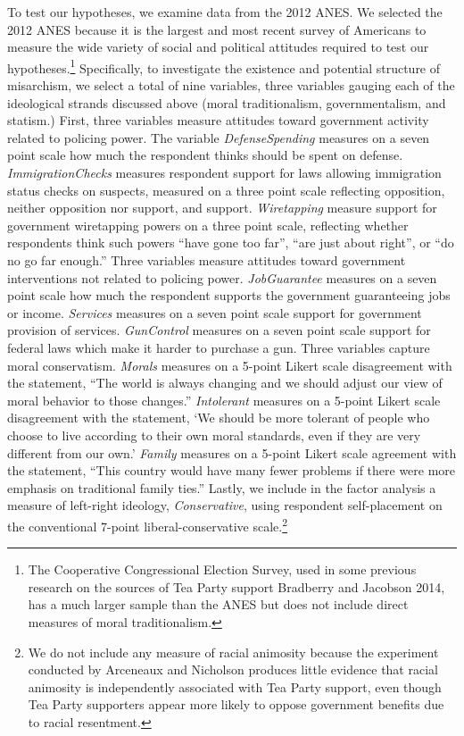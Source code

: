 \documentclass[12pt,]{article}
\begin{document}
To test our hypotheses, we examine data from the 2012 ANES. We selected
the 2012 ANES because it is the largest and most recent survey of
Americans to measure the wide variety of social and political attitudes
required to test our hypotheses.\footnote{The Cooperative Congressional
  Election Survey, used in some previous research on the sources of Tea
  Party support Bradberry and Jacobson 2014, has a much larger sample
  than the ANES but does not include direct measures of moral
  traditionalism.} Specifically, to investigate the existence and
potential structure of misarchism, we select a total of nine variables,
three variables gauging each of the ideological strands discussed above
(moral traditionalism, governmentalism, and statism.) First, three
variables measure attitudes toward government activity related to
policing power. The variable \emph{DefenseSpending} measures on a seven
point scale how much the respondent thinks should be spent on defense.
\emph{ImmigrationChecks} measures respondent support for laws allowing
immigration status checks on suspects, measured on a three point scale
reflecting opposition, neither opposition nor support, and support.
\emph{Wiretapping} measure support for government wiretapping powers on
a three point scale, reflecting whether respondents think such powers
``have gone too far'', ``are just about right'', or ``do no go far
enough.'' Three variables measure attitudes toward government
interventions not related to policing power. \emph{JobGuarantee}
measures on a seven point scale how much the respondent supports the
government guaranteeing jobs or income. \emph{Services} measures on a
seven point scale support for government provision of services.
\emph{GunControl} measures on a seven point scale support for federal
laws which make it harder to purchase a gun. Three variables capture
moral conservatism. \emph{Morals} measures on a 5-point Likert scale
disagreement with the statement, ``The world is always changing and we
should adjust our view of moral behavior to those changes.''
\emph{Intolerant} measures on a 5-point Likert scale disagreement with
the statement, `We should be more tolerant of people who choose to live
according to their own moral standards, even if they are very different
from our own.' \emph{Family} measures on a 5-point Likert scale
agreement with the statement, ``This country would have many fewer
problems if there were more emphasis on traditional family ties.''
Lastly, we include in the factor analysis a measure of left-right
ideology, \emph{Conservative}, using respondent self-placement on the
conventional 7-point liberal-conservative scale.\footnote{We do not
  include any measure of racial animosity because the experiment
  conducted by Arceneaux and Nicholson produces little evidence that
  racial animosity is independently associated with Tea Party support,
  even though Tea Party supporters appear more likely to oppose
  government benefits due to racial resentment.}
\end{document}

